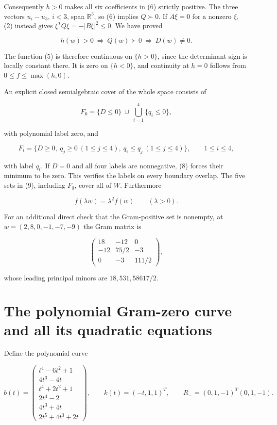 \documentclass[11pt]{article}
\begin{document}
Consequently \(h>0\) makes all six coefficients in (6) strictly positive.
The three vectors \(u_i-u_3\), \(i<3\), span \(\mathbb R^3\), so (6)
implies \(Q\succ0\). If \(A\xi=0\) for a nonzero \(\xi\), (2) instead
gives \(\xi^TQ\xi=-|B\xi|^2\le0\). We have proved

\[
h(w)>0\ \Longrightarrow\ Q(w)\succ0\ \Longrightarrow\ D(w)\ne0.
\tag{8}
\]

The function (5) is therefore continuous on \(\{h>0\}\), since the
determinant sign is locally constant there. It is zero on \(\{h<0\}\), and
continuity at \(h=0\) follows from \(0\le f\le\max(h,0)\).

An explicit closed semialgebraic cover of the whole space consists of

\[
F_0=\{D\le0\}\ \cup\ \bigcup_{i=1}^4\{q_i\le0\},
\]

with polynomial label zero, and

\[
F_i=\{D\ge0,\ q_j\ge0\ (1\le j\le4),\ q_i\le q_j\ (1\le j\le4)\},
\qquad1\le i\le4,
\tag{9}
\]

with label \(q_i\). If \(D=0\) and all four labels are nonnegative, (8)
forces their minimum to be zero. This verifies the labels on every boundary
overlap. The five sets in (9), including \(F_0\), cover all of \(W\).
Furthermore

\[
f(\lambda w)=\lambda^2 f(w)\qquad(\lambda>0).
\tag{10}
\]

For an additional direct check that the Gram-positive set is nonempty, at
\(w=(2,8,0,-1,-7,-9)\) the Gram matrix is

\[
\begin{pmatrix}18&-12&0\\-12&75/2&-3\\0&-3&111/2\end{pmatrix},
\]

whose leading principal minors are \(18,531,58617/2\).

\section{The polynomial Gram-zero curve and all its quadratic equations}

Define the polynomial curve

\[
b(t)=\begin{pmatrix}
t^4-6t^2+1\\
4t^3-4t\\
t^4+2t^2+1\\
2t^4-2\\
4t^3+4t\\
2t^5+4t^3+2t
\end{pmatrix},
\qquad k(t)=(-t,1,1)^T,
\qquad
R_-=(0,1,-1)^T(0,1,-1).
\tag{11}
\]
\end{document}
